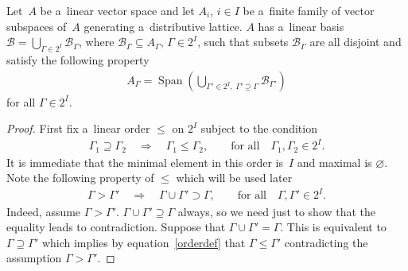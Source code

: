 \documentclass[pdftex]{sigma}
\DeclareMathOperator{\Span}{Span}
\begin{document}
\begin{lemma}
\label{partlem}
Let~$A$ be a~linear vector space and let $A_i$, $i\in I$ be a~finite family of vector subspaces of~$A$ generating a~distributive lattice.
$A$ has a~linear basis $\mathcal{B}=\bigcup_{\Gamma\in2^I}\mathcal{B}_\Gamma$, where
$\mathcal{B}_\Gamma\subseteq A_\Gamma$, $\Gamma\in2^I$, such that subsets $\mathcal{B}_\Gamma$ are all disjoint and
satisfy the following property
\begin{gather}
\label{partition}
A_\Gamma=\Span\left(\bigcup_{\Gamma'\in2^I,\; \Gamma'\supseteq\Gamma}\mathcal{B}_{\Gamma'}\right)  %
\end{gather}
for all $\Gamma\in2^I$.
\end{lemma}
\begin{proof}
First f\/ix a~linear order $\leq$ on $2^I$ subject to the condition
\begin{gather}
\label{orderdef}
\Gamma_1\supseteq \Gamma_2
\quad
\Rightarrow
\quad
\Gamma_1\leq\Gamma_2,
\qquad
\text{for all}
\quad
\Gamma_1,\Gamma_2\in 2^I.
\end{gather}
It is immediate that the minimal element in this order is~$I$ and maximal is $\varnothing$.
Note the following property of $\leq$ which will be used later
\begin{gather}
\label{Order}
\Gamma>\Gamma'
\quad
\Rightarrow
\quad
\Gamma\cup\Gamma'\supset \Gamma,
\qquad
\text{for all}
\quad
\Gamma,\Gamma'\in2^I.
\end{gather}
Indeed, assume $\Gamma>\Gamma'$.
$\Gamma\cup\Gamma'\supseteq \Gamma$ always, so we need just to show that the equality leads to contradiction.
Suppose that $\Gamma\cup\Gamma'= \Gamma$.
This is equivalent to $\Gamma\supseteq\Gamma'$ which implies by equation~\eqref{orderdef} that $\Gamma\leq\Gamma'$
contradicting the assumption $\Gamma>\Gamma'$.


\end{proof}
\end{document}
